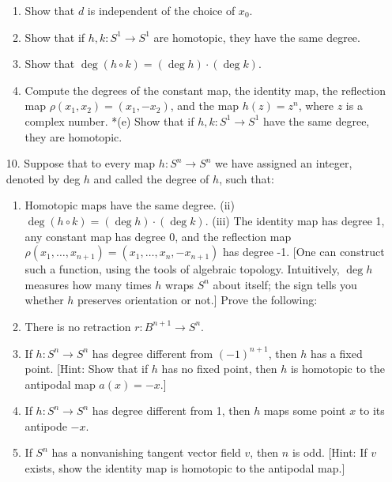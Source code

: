 \begin{enumerate}[itemsep=0.4em, parsep=0pt, topsep=0pt, partopsep=0pt, leftmargin=*, label=\arabic*., ref=\arabic*]
 \begin{enumerate}[itemsep=0.2em, parsep=0pt, topsep=0pt, partopsep=0pt, leftmargin=*, label=(\alph*), align=left]
 \item Show that \(d\) is independent of the choice of \(x_{0}\).
 \item Show that if \(h,k : S^{1} \rightarrow {S}^{1}\) are homotopic, they have the same degree.
 \item Show that \(\deg ( {h \circ k}) = ( {\deg h}) \cdot ( {\deg k})\).
 \item Compute the degrees of the constant map, the identity map, the reflection map \(\rho ( {x_{1},x_{2}}) = ( {x_{1}, - x_{2}})\), and the map \(h( z) = z^{n}\), where \(z\) is a complex number. *(e) Show that if \(h,k : S^{1} \rightarrow {S}^{1}\) have the same degree, they are homotopic.
 \end{enumerate}
\item[10.] Suppose that to every map \(h : S^{n} \rightarrow {S}^{n}\) we have assigned an integer, denoted by deg \(h\) and called the degree of \(h\), such that:
 \begin{enumerate}[itemsep=0.2em, parsep=0pt, topsep=0pt, partopsep=0pt, leftmargin=*, label=(\alph*), align=left]
 \item Homotopic maps have the same degree. (ii) \(\deg ( {h \circ k}) = ( {\deg h}) \cdot ( {\deg k})\). (iii) The identity map has degree 1, any constant map has degree 0, and the reflection map \(\rho ( {x_{1},\ldots ,x_{n + 1}}) = ( {x_{1},\ldots ,x_{n}, - x_{n + 1}})\) has degree -1. [One can construct such a function, using the tools of algebraic topology. Intuitively, \(\deg h\) measures how many times \(h\) wraps \(S^{n}\) about itself; the sign tells you whether \(h\) preserves orientation or not.] Prove the following:
 \item There is no retraction \(r : B^{n + 1} \rightarrow {S}^{n}\).
 \item If \(h : S^{n} \rightarrow {S}^{n}\) has degree different from \({( -1) }^{n + 1}\), then \(h\) has a fixed point. [Hint: Show that if \(h\) has no fixed point, then \(h\) is homotopic to the antipodal map \(a(x) = - x\).]
 \item If \(h : S^{n} \rightarrow {S}^{n}\) has degree different from 1, then \(h\) maps some point \(x\) to its antipode \(- x\).
 \item If \(S^{n}\) has a nonvanishing tangent vector field \(v\), then \(n\) is odd. [Hint: If \(v\) exists, show the identity map is homotopic to the antipodal map.]
 \end{enumerate}
\end{enumerate}


